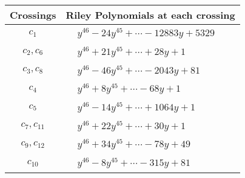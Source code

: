 \documentclass[1p]{elsarticle_modified}
\theoremstyle{definition}
\begin{document}
\begin{tabular}{m{50pt}|m{274pt}}
Crossings & \hspace{64pt}Riley Polynomials at each crossing \\
\hline $$\begin{aligned}c_{1}\end{aligned}$$&$\begin{aligned}
&y^{46}-24 y^{45}+\cdots-12883 y+5329
\end{aligned}$\\
\hline $$\begin{aligned}c_{2},c_{6}\end{aligned}$$&$\begin{aligned}
&y^{46}+21 y^{45}+\cdots+28 y+1
\end{aligned}$\\
\hline $$\begin{aligned}c_{3},c_{8}\end{aligned}$$&$\begin{aligned}
&y^{46}-46 y^{45}+\cdots-2043 y+81
\end{aligned}$\\
\hline $$\begin{aligned}c_{4}\end{aligned}$$&$\begin{aligned}
&y^{46}+8 y^{45}+\cdots-68 y+1
\end{aligned}$\\
\hline $$\begin{aligned}c_{5}\end{aligned}$$&$\begin{aligned}
&y^{46}-14 y^{45}+\cdots+1064 y+1
\end{aligned}$\\
\hline $$\begin{aligned}c_{7},c_{11}\end{aligned}$$&$\begin{aligned}
&y^{46}+22 y^{45}+\cdots+30 y+1
\end{aligned}$\\
\hline $$\begin{aligned}c_{9},c_{12}\end{aligned}$$&$\begin{aligned}
&y^{46}+34 y^{45}+\cdots-78 y+49
\end{aligned}$\\
\hline $$\begin{aligned}c_{10}\end{aligned}$$&$\begin{aligned}
&y^{46}-8 y^{45}+\cdots-315 y+81
\end{aligned}$\\
\hline
\end{tabular}\\~\\
\end{document}
